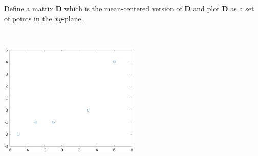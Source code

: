 Define a matrix $\boldsymbol{\tilde{D}}$ which is the mean-centered version of $\boldsymbol{D}$ and plot $\boldsymbol{\tilde{D}}$ as a set of points in the $xy$-plane.

\begin{solution}\
    \begin{center}
        \includegraphics[width=0.5\textwidth]{img/e1p2.png}
    \end{center}
\end{solution}